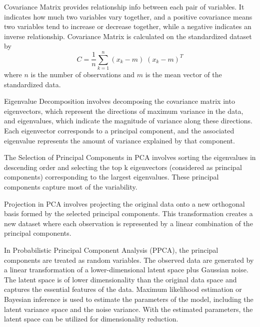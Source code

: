 \documentclass[12pt,a4paper,english
]{tunithesis}
\begin{document}
Covariance Matrix provides relationship info between each pair of variables. It indicates how much two variables vary together, and a positive covariance means two variables tend to increase or decrease together, while a negative indicates an inverse relationship. Covariance Matrix is calculated on the standardized dataset by 
\begin{equation}
    C = \frac{1}{n}\sum\limits_{k=1}^n (x_k -  m)\;( x_k -  m)^T
\end{equation}
where $n$ is the number of observations and $m$ is the mean vector of the standardized data.

Eigenvalue Decomposition involves decomposing the covariance matrix into eigenvectors, which represent the directions of maximum variance in the data, and eigenvalues, which indicate the magnitude of variance along these directions. Each eigenvector corresponds to a principal component, and the associated eigenvalue represents the amount of variance explained by that component.

The Selection of Principal Components in PCA involves sorting the eigenvalues in descending order and selecting the top k eigenvectors (considered as principal components) corresponding to the largest eigenvalues. These principal components capture most of the variability.

Projection in PCA involves projecting the original data onto a new orthogonal basis formed by the selected principal components. This transformation creates a new dataset where each observation is represented by a linear combination of the principal components.

In Probabilistic Principal Component Analysis (PPCA), the principal components are treated as random variables. The observed data are generated by a linear transformation of a lower-dimensional latent space plus Gaussian noise. The latent space is of lower dimensionality than the original data space and captures the essential features of the data. Maximum likelihood estimation or Bayesian inference is used to estimate the parameters of the model, including the latent variance space and the noise variance. With the estimated parameters, the latent space can be utilized for dimensionality reduction.
\end{document}
